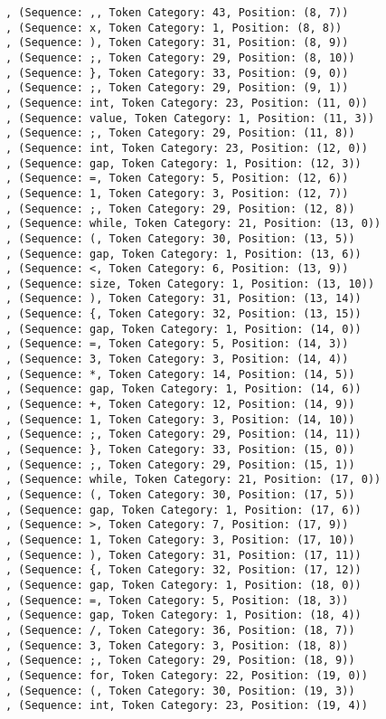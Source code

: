 \documentclass[a4paper, 12pt, article]{memoir}
\begin{document}
\begin{lstlisting}
, (Sequence: ,, Token Category: 43, Position: (8, 7))
, (Sequence: x, Token Category: 1, Position: (8, 8))
, (Sequence: ), Token Category: 31, Position: (8, 9))
, (Sequence: ;, Token Category: 29, Position: (8, 10))
, (Sequence: }, Token Category: 33, Position: (9, 0))
, (Sequence: ;, Token Category: 29, Position: (9, 1))
, (Sequence: int, Token Category: 23, Position: (11, 0))
, (Sequence: value, Token Category: 1, Position: (11, 3))
, (Sequence: ;, Token Category: 29, Position: (11, 8))
, (Sequence: int, Token Category: 23, Position: (12, 0))
, (Sequence: gap, Token Category: 1, Position: (12, 3))
, (Sequence: =, Token Category: 5, Position: (12, 6))
, (Sequence: 1, Token Category: 3, Position: (12, 7))
, (Sequence: ;, Token Category: 29, Position: (12, 8))
, (Sequence: while, Token Category: 21, Position: (13, 0))
, (Sequence: (, Token Category: 30, Position: (13, 5))
, (Sequence: gap, Token Category: 1, Position: (13, 6))
, (Sequence: <, Token Category: 6, Position: (13, 9))
, (Sequence: size, Token Category: 1, Position: (13, 10))
, (Sequence: ), Token Category: 31, Position: (13, 14))
, (Sequence: {, Token Category: 32, Position: (13, 15))
, (Sequence: gap, Token Category: 1, Position: (14, 0))
, (Sequence: =, Token Category: 5, Position: (14, 3))
, (Sequence: 3, Token Category: 3, Position: (14, 4))
, (Sequence: *, Token Category: 14, Position: (14, 5))
, (Sequence: gap, Token Category: 1, Position: (14, 6))
, (Sequence: +, Token Category: 12, Position: (14, 9))
, (Sequence: 1, Token Category: 3, Position: (14, 10))
, (Sequence: ;, Token Category: 29, Position: (14, 11))
, (Sequence: }, Token Category: 33, Position: (15, 0))
, (Sequence: ;, Token Category: 29, Position: (15, 1))
, (Sequence: while, Token Category: 21, Position: (17, 0))
, (Sequence: (, Token Category: 30, Position: (17, 5))
, (Sequence: gap, Token Category: 1, Position: (17, 6))
, (Sequence: >, Token Category: 7, Position: (17, 9))
, (Sequence: 1, Token Category: 3, Position: (17, 10))
, (Sequence: ), Token Category: 31, Position: (17, 11))
, (Sequence: {, Token Category: 32, Position: (17, 12))
, (Sequence: gap, Token Category: 1, Position: (18, 0))
, (Sequence: =, Token Category: 5, Position: (18, 3))
, (Sequence: gap, Token Category: 1, Position: (18, 4))
, (Sequence: /, Token Category: 36, Position: (18, 7))
, (Sequence: 3, Token Category: 3, Position: (18, 8))
, (Sequence: ;, Token Category: 29, Position: (18, 9))
, (Sequence: for, Token Category: 22, Position: (19, 0))
, (Sequence: (, Token Category: 30, Position: (19, 3))
, (Sequence: int, Token Category: 23, Position: (19, 4))

\end{lstlisting}
\end{document}
